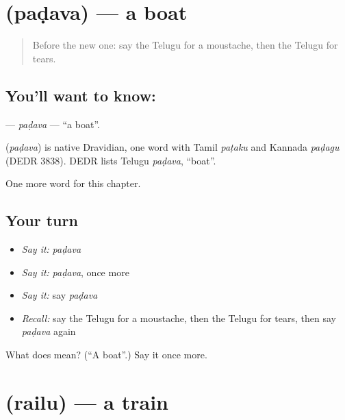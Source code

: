 \section[\texorpdfstring{\te{పడవ} (paḍava)}{పడవ (paḍava)}]{ (paḍava) — a boat}

\label{lesson:TE-C133-padava}



\begin{quote}
Before the new one: say the Telugu for a moustache, then the Telugu for tears.
\end{quote}

\subsection*{You'll want to know: }
\textbf{} — \emph{paḍava} — \textquotedblleft{}a boat\textquotedblright{}.

\begin{cousinweb}
\textbf{} (\emph{paḍava}) is native Dravidian, one word with Tamil \emph{paṭaku} and Kannada \emph{paḍagu} (DEDR 3838). DEDR lists Telugu \emph{paḍava}, \textquotedblleft{}boat\textquotedblright{}.
\end{cousinweb}

\begin{grammarlens}[title={What you've built}]
One more word for this chapter.
\end{grammarlens}

\subsection*{Your turn}
\begin{itemize}
\raggedright
  \item \emph{Say it:} \emph{paḍava}
  \item \emph{Say it:} \emph{paḍava}, once more
  \item \emph{Say it:} say \emph{paḍava}
  \item \emph{Recall:} say the Telugu for a moustache, then the Telugu for tears, then say \emph{paḍava} again
\end{itemize}

\begin{tcolorbox}[breakable,colback=teal!4,colframe=teal!35!black,title={Before you move on}]
What does  mean? (\textquotedblleft{}A boat\textquotedblright{}.) Say it once more.
\end{tcolorbox}
\section[\texorpdfstring{\te{రైలు} (railu)}{రైలు (railu)}]{ (railu) — a train}

